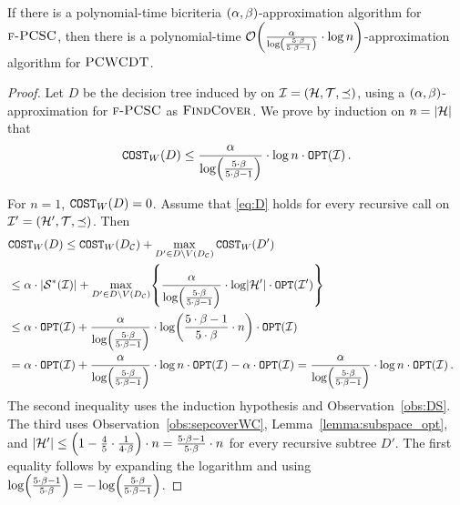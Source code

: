 \begin{theorem} \label{thm:PCSC-to-PCWCDT}
If there is a polynomial-time bicriteria $\br{\alpha, \beta}$-approximation algorithm for $\ProblemPCSC$, then there is a polynomial-time
$\bigo\br{\frac{\alpha}{\log\br{\frac{5\cdot\beta}{5\cdot\beta -1}}} \cdot \log n}$-approximation algorithm for $\ProblemPCWCDT$.
\end{theorem}
\begin{proof}
     \setlength{\emergencystretch}{2em}
     Let $D$ be the decision tree induced by \ProcDecisionTree on $\cI=\br{\cH,\cT,\preceq}$, using a $\br{\alpha,\beta}$-approximation for $\ProblemPCSC$ as $\blackBox$.
     We prove by induction on $n=\spr{\cH}$ that
     \begin{equation} \label{eq:D}
     \COSTW\br{D} \leq \frac{\alpha}{\log\br{\frac{5\cdot\beta}{5\cdot\beta -1}}}\cdot \log n \cdot \OPT\br{\cI}.
     \end{equation}

     For $n=1$, $\COSTW\br{D}=0$. Assume that \eqref{eq:D} holds for every recursive call on $\cI'=\br{\cH',\cT,\preceq}$. Then
        \begin{align*}
            &\COSTW\br{D}\leq \COSTW\br{D_{\cC}}+\max_{D'\in D\setminus V\br{D_{\cC}}}\COSTW\br{D'} &&\\
            &\leq \alpha\cdot\spr{\sepcover{\cI}}+\max_{D'\in D\setminus V\br{D_{\cC}}}\brc{\frac{\alpha}{\log\br{\frac{5\cdot\beta}{5\cdot\beta-1}}}\cdot\log\spr{\cH'}\cdot\OPT\br{\cI'}} &&\\
            &\leq \alpha\cdot\OPT\br{\cI}+\frac{\alpha}{\log\br{\frac{5\cdot\beta}{5\cdot\beta-1}}}\cdot\log\br{\frac{5\cdot\beta-1}{5\cdot\beta}\cdot n}\cdot\OPT\br{\cI} &&\\
            &=\alpha\cdot\OPT\br{\cI}+\frac{\alpha}{\log\br{\frac{5\cdot\beta}{5\cdot\beta-1}}}\cdot\log n\cdot\OPT\br{\cI}-\alpha\cdot\OPT\br{\cI}
            =\frac{\alpha}{\log\br{\frac{5\cdot\beta}{5\cdot\beta-1}}}\cdot\log n\cdot\OPT\br{\cI}. &&
        \end{align*}
        The second inequality uses the induction hypothesis and Observation~\ref{obs:DS}. The third uses Observation~\ref{obs:sepcoverWC}, Lemma~\ref{lemma:subspace_opt}, and $\spr{\cH'}\leq\br{1-\frac45\cdot\frac{1}{4\cdot\beta}}\cdot n=\frac{5\cdot\beta-1}{5\cdot\beta}\cdot n$ for every recursive subtree $D'$. The first equality follows by expanding the logarithm and using $\log\br{\frac{5\cdot\beta-1}{5\cdot\beta}}=-\log\br{\frac{5\cdot\beta}{5\cdot\beta-1}}$.
\end{proof}

